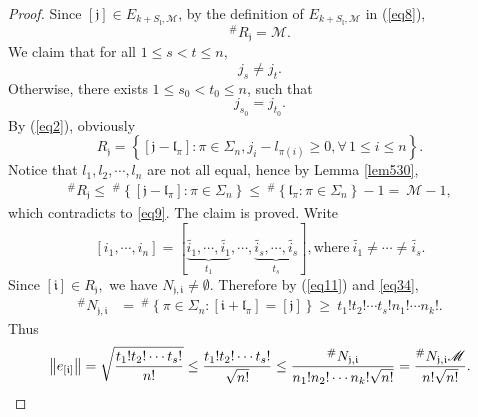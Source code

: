 \documentclass[11pt]{article}
\theoremstyle{plain}
\theoremstyle{definition}
\begin{document}
\begin{proof}
	Since $[\mathfrak{j}]\in E_{k+S_{\mathfrak{l}},\mathscr{M}}$, by the definition of $E_{k+S_{\mathfrak{l}},\mathscr{M}}$ in (\ref{eq8}),
	\begin{equation}\label{eq9}
		^{\#  } R_{\mathfrak{j}  }  =\mathscr{M} .
	\end{equation}
We claim that for all $1 \le s < t \le n,$
	\begin{equation}\label{eq34}
		j_{s} \ne j_{t}.
	\end{equation}
	Otherwise, there exists $1 \le s_0 < t_0 \le n$, such that \begin{equation}\label{eq3411}j_{s_0}=j_{t_0}.\end{equation} By (\ref{eq2}), obviously
	$$R_{\mathfrak{j}  }    =
	\left \{ [\mathfrak{j}-\mathfrak{l}_{\pi}] :\pi \in \Sigma_{n} , j_{i}-l_{\pi(i)}  \ge 0, \forall \, 1\le i \le n\right \}.$$
	Notice that $l_{1},l_{2},\cdots,l_{n}$  are not all equal, hence by Lemma \ref{lem530},
		$$\begin{aligned}
		^{\#  } R_{\mathfrak{j}  }
		\le  \ ^{\#  }\left \{ [\mathfrak{j}-\mathfrak{l}_{\pi}] :\pi \in \Sigma_{n} \right \}
		  \le \ ^{\#  }\left \{ \mathfrak{l}_{\pi}  :\pi \in \Sigma_{n} \right \}  - 1
		 =  \ \mathscr{M}-1,
	\end{aligned}$$
which contradicts to \eqref{eq9}. The claim is proved.
	Write
	$$[i_1,\cdots,i_n]=[\underbrace{\widetilde{i_{1}},\cdots,\widetilde{i_{1}} }_{t_{1}} ,\cdots,\underbrace{\widetilde{i_{s}},\cdots,\widetilde{i_{s}} }_{t_{s}}], \mathrm{where} \ \widetilde{i_{1}} \ne \cdots \ne \widetilde{i_{s}}.$$
Since $[\mathfrak{i}] \in R_{\mathfrak{j} },$ we have $ N_{\mathfrak{j},\mathfrak{i} }  \neq \emptyset.$
	Therefore by (\ref{eq11}) and \eqref{eq34},
	$$ \begin{aligned}
		^{\#  } N_{\mathfrak{j},\mathfrak{i} }  &= \ ^{\#  } \left \{\pi \in \Sigma_{n}:[\mathfrak{i}+\mathfrak{l}_{\pi}]=[\mathfrak{j}] \right \}
		\ge \  t_{1}!t_{2}!\cdots t_{s}!n_{1}!\cdots n_{k}!.
	\end{aligned} $$
	Thus	
\begin{equation*}
	\left \|  e_{[\mathfrak{i}]}  \right \|=\sqrt{\frac{t_{1}!t_{2}!\cdots t_{s}!}{n!}}
	\leq \frac{t_{1}!t_{2}!\cdots t_{s}!}{\sqrt{n!}}
	\leq\frac{ ^{\#  } N_{\mathfrak{j},\mathfrak{i} }}{n_1!n_2!\cdots n_k!\sqrt{n!}}
	= \frac{^{\#  } N_{\mathfrak{j},\mathfrak{i} }\mathscr{M}}{n!\sqrt{n!}}.  \qedhere
\end{equation*}
\end{proof}
\end{document}
